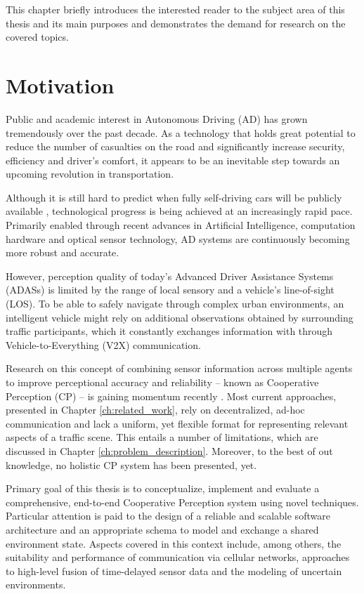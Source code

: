 This chapter briefly introduces the interested reader to the subject area of this thesis and its main purposes and demonstrates the demand for research on the covered topics. 

\section{Motivation}
\label{sec:motivation}
Public and academic interest in Autonomous Driving (AD) has grown tremendously over the past decade. As a technology that holds great potential to reduce the number of casualties on the road and significantly increase security, efficiency and driver's comfort, it appears to be an inevitable step towards an upcoming revolution in transportation.
\par
\bigskip

Although it is still hard to predict when fully self-driving cars will be publicly available \cite{Frost&SulivanConsulting2018}, technological progress is being achieved at an increasingly rapid pace. Primarily enabled through recent advances in Artificial Intelligence, computation hardware and optical sensor technology, AD systems are continuously becoming more robust and accurate.
\par
\bigskip

However, perception quality of today's Advanced Driver Assistance Systems (ADASs) is limited by the range of local sensory and a vehicle's line-of-sight (LOS). To be able to safely navigate through complex urban environments, an intelligent vehicle might rely on additional observations obtained by surrounding traffic participants, which it constantly exchanges information with through Vehicle-to-Everything (V2X) communication. 
\par
\bigskip

Research on this concept of combining sensor information across multiple agents to improve perceptional accuracy and reliability – known as Cooperative Perception (CP) – is gaining momentum recently \cite{Chen2019, Thandavarayan2019, Calvo2017}. Most current approaches, presented in Chapter \ref{ch:related_work}, rely on decentralized, ad-hoc communication and lack a uniform, yet flexible format for representing relevant aspects of a traffic scene. This entails a number of limitations, which are discussed in Chapter \ref{ch:problem_description}. Moreover, to the best of out knowledge, no holistic CP system has been presented, yet. 
\par
\bigskip

Primary goal of this thesis is to conceptualize, implement and evaluate a comprehensive, end-to-end Cooperative Perception system using novel techniques. Particular attention is paid to the design of a reliable and scalable software architecture and an appropriate schema to model and exchange a shared environment state. Aspects covered in this context include, among others, the suitability and performance of communication via cellular networks, approaches to high-level fusion of time-delayed sensor data and the modeling of uncertain environments. 